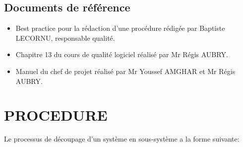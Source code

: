 \subsection{Documents de référence}
\begin{itemize}
\item Best practice pour la rédaction d'une procédure rédigée par Baptiste LECORNU, responsable qualité.
\item Chapitre 13 du cours de qualité logiciel réalisé par Mr Régis AUBRY.
\item Manuel du chef de projet réalisé par Mr Youssef AMGHAR et Mr Régis AUBRY.
\end{itemize}


\section{PROCEDURE}
Le processus de découpage d'un système en sous-système a la forme suivante:

